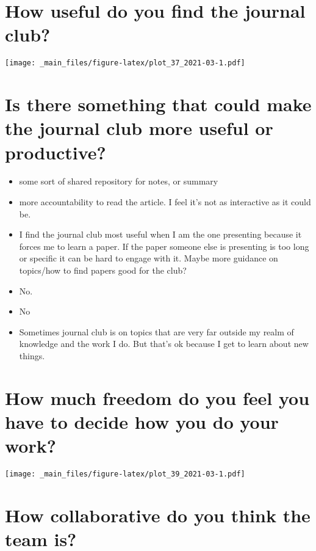 \documentclass[
]{book}
\providecommand{\tightlist}{%
  \setlength{\itemsep}{0pt}\setlength{\parskip}{0pt}}
\begin{document}
\hypertarget{how-useful-do-you-find-the-journal-club-1}{%
\section{How useful do you find the journal club?}\label{how-useful-do-you-find-the-journal-club-1}}

\texttt{[image: \_main\_files/figure-latex/plot\_37\_2021-03-1.pdf]}

\hypertarget{is-there-something-that-could-make-the-journal-club-more-useful-or-productive-1}{%
\section{Is there something that could make the journal club more useful or productive?}\label{is-there-something-that-could-make-the-journal-club-more-useful-or-productive-1}}

\begin{itemize}
\tightlist
\item
  some sort of shared repository for notes, or summary
\item
  more accountability to read the article. I feel it's not as interactive as it could be.
\item
  I find the journal club most useful when I am the one presenting because it forces me to learn a paper. If the paper someone else is presenting is too long or specific it can be hard to engage with it. Maybe more guidance on topics/how to find papers good for the club?
\item
  No.
\item
  No
\item
  Sometimes journal club is on topics that are very far outside my realm of knowledge and the work I do. But that's ok because I get to learn about new things.
\end{itemize}

\hypertarget{how-much-freedom-do-you-feel-you-have-to-decide-how-you-do-your-work-1}{%
\section{How much freedom do you feel you have to decide how you do your work?}\label{how-much-freedom-do-you-feel-you-have-to-decide-how-you-do-your-work-1}}

\texttt{[image: \_main\_files/figure-latex/plot\_39\_2021-03-1.pdf]}

\hypertarget{how-collaborative-do-you-think-the-team-is-1}{%
\section{How collaborative do you think the team is?}\label{how-collaborative-do-you-think-the-team-is-1}}
\end{document}
